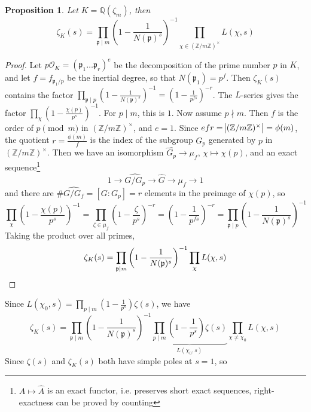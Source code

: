 \documentclass[11pt]{article}
\theoremstyle{definition}
\theoremstyle{plain}
\newtheorem{proposition}[definition]{Proposition}
\theoremstyle{remark}
\newcommand{\ZZ}{\mathbb{Z}}
\newcommand{\QQ}{\mathbb{Q}}
\newcommand{\cO}{\mathcal{O}}
\newcommand{\fp}{\mathfrak{p}}
\begin{document}
\begin{proposition}\label{prop:7_17}
    Let $K = \QQ(\zeta_m)$, then
    \begin{equation*}
        \zeta_K(s) = \prod_{\fp \mid m} \left(1 - \frac{1}{N(\fp)^s}\right)^{-1} \prod_{\chi \in \widehat{(\ZZ / m \ZZ)^\times}} L(\chi, s)
    \end{equation*}
\end{proposition}
\begin{proof}
    Let $p \cO_K = (\fp_1 \ldots \fp_r)^e$ be the decomposition of the prime number $p$ in $K$, and let $f = f_{\fp_1/p}$ be the inertial degree, so that $N(\fp_1) = p^f$. Then $\zeta_K(s)$ contains the factor $\prod_{\fp \mid p} \left(1 - \frac{1}{N(\fp)^s}\right)^{-1} = \left(1 - \frac{1}{p^{fs}}\right)^{-r}$. The $L$-series gives the factor $\prod_{\chi} \left(1 - \frac{\chi(p)}{p^s}\right)^{-1}$. For $p \mid m$, this is $1$. Now assume $p \nmid m$. Then $f$ is the order of $p \pmod{m}$ in $(\ZZ/m\ZZ)^\times$, and $e = 1$. %
    Since $efr = \abs{(\ZZ / m \ZZ)^\times} = \phi(m)$, the quotient $r = \frac{\phi(m)}{f}$ is the index of the subgroup $G_p$ generated by $p$ in $(\ZZ / m \ZZ)^\times$. Then we have an isomorphism $\widehat{G_p} \to \mu_f$, $\chi \mapsto \chi(p)$, and an exact sequence\footnote{$A \mapsto \widehat{A}$ is an exact functor, i.e. preserves short exact sequences, right-exactness can be proved by counting}
    \begin{equation*}
        1 \longrightarrow \widehat{G/G_p} \longrightarrow \widehat{G} \longrightarrow \mu_f \longrightarrow 1
    \end{equation*}
    and there are $\# \widehat{G / G_f} = [G : G_p] = r$ elements in the preimage of $\chi(p)$, so
    \begin{equation*}
        \prod_{\chi} \left(1-\frac{\chi(p)}{p^s}\right)^{-1} = \prod_{\zeta \in \mu_f} \left(1 - \frac{\zeta}{p^s}\right)^{-r} = \left(1-\frac{1}{p^{fs}}\right)^{-r} = \prod_{\fp \mid p} \left(1-\frac{1}{N(\fp)^s}\right)^{-1}
    \end{equation*}
    Taking the product over all primes,
    \begin{equation*}
        \zeta_K(s) = \prod_{\fp \mid m} \left(1 - \frac{1}{N(\fp)^s}\right)^{-1} \prod_{\chi} L(\chi, s) \qedhere
    \end{equation*}
\end{proof}

\noindent Since $L(\chi_0, s) = \prod_{p \mid m} (1 - \frac{1}{p^s}) \zeta(s)$, we have
\begin{equation*}
    \zeta_K(s) = \prod_{\fp \mid m} \left(1 - \frac{1}{N(\fp)^s}\right)^{-1} \underbrace{\prod_{p \mid m} \left(1 - \frac{1}{p^s}\right) \zeta(s)}_{L(\chi_0, s)} \prod_{\chi \neq \chi_0} L(\chi, s)
\end{equation*}
Since $\zeta(s)$ and $\zeta_K(s)$ both have simple poles at $s = 1$, so
\end{document}
